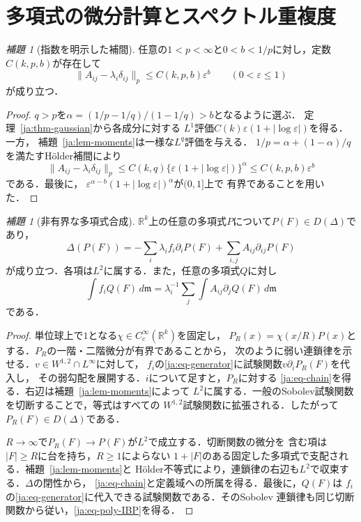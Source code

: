 \documentclass[12pt]{amsart}
\theoremstyle{definition}
\theoremstyle{remark}
\numberwithin{equation}{section}
\newcommand{\R}{\mathbb{R}}
\newcommand{\m}{\mathfrak m}
\theoremstyle{jpplain}
\newtheorem{jlem}[thm]{補題}
\begin{document}
\section{多項式の微分計算とスペクトル重複度}

\begin{jlem}[指数を明示した補間]\label{ja:lem-interp}
任意の$1<p<\infty$と$0<b<1/p$に対し，定数$C(k,p,b)$が存在して
\begin{equation}\label{ja:eq-Lp}
 \|A_{ij}-\lambda_i\delta_{ij}\|_p\leq C(k,p,b)\varepsilon^b
 \qquad(0<\varepsilon\leq1)
\end{equation}
が成り立つ．
\end{jlem}
\begin{proof}
$q>p$を$\alpha=(1/p-1/q)/(1-1/q)>b$となるように選ぶ．
定理~\ref{ja:thm-gaussian}から各成分に対する
$L^1$評価$C(k)\varepsilon(1+|\log\varepsilon|)$を得る．一方，
補題~\ref{ja:lem-moments}は一様な$L^q$評価を与える．
$1/p=\alpha+(1-\alpha)/q$を満たすHölder補間により
\[
 \|A_{ij}-\lambda_i\delta_{ij}\|_p
 \leq C(k,q)\{\varepsilon(1+|\log\varepsilon|)\}^{\alpha}
 \leq C(k,p,b)\varepsilon^b
\]
である．最後に，
$\varepsilon^{\alpha-b}(1+|\log\varepsilon|)^\alpha$が$(0,1]$上で
有界であることを用いた．
\end{proof}

\begin{jlem}[非有界な多項式合成]\label{ja:lem-domain}
$\R^k$上の任意の多項式$P$について$P(F)\in D(\Delta)$であり，
\begin{equation}\label{ja:eq-chain}
 \Delta(P(F))=-\sum_i\lambda_i f_i\partial_iP(F)
              +\sum_{i,j}A_{ij}\partial_{ij}P(F)
\end{equation}
が成り立つ．各項は$L^2$に属する．また，任意の多項式$Q$に対し
\begin{equation}\label{ja:eq-poly-IBP}
 \int f_iQ(F)\,d\m
 =\lambda_i^{-1}\sum_j\int A_{ij}\partial_jQ(F)\,d\m
\end{equation}
である．
\end{jlem}
\begin{proof}
単位球上で$1$となる$\chi\in C_c^\infty(\R^k)$を固定し，
$P_R(x)=\chi(x/R)P(x)$とする．$P_R$の一階・二階微分が有界であることから，
次のように弱い連鎖律を示せる．$v\in W^{1,2}\cap L^\infty$に対して，
$f_i$の\eqref{ja:eq-generator}に試験関数$v\partial_iP_R(F)$を代入し，
その弱勾配を展開する．$i$について足すと，$P_R$に対する
\eqref{ja:eq-chain}を得る．右辺は補題~\ref{ja:lem-moments}によって
$L^2$に属する．一般のSobolev試験関数を切断することで，等式はすべての
$W^{1,2}$試験関数に拡張される．したがって$P_R(F)\in D(\Delta)$である．

$R\to\infty$で$P_R(F)\to P(F)$が$L^2$で成立する．切断関数の微分を
含む項は$|F|\geq R$に台を持ち，$R\geq1$によらない
$1+|F|$のある固定した多項式で支配される．補題~\ref{ja:lem-moments}と
Hölder不等式により，連鎖律の右辺も$L^2$で収束する．$\Delta$の閉性から，
\eqref{ja:eq-chain}と定義域への所属を得る．最後に，$Q(F)$は
$f_i$の\eqref{ja:eq-generator}に代入できる試験関数である．そのSobolev
連鎖律も同じ切断関数から従い，\eqref{ja:eq-poly-IBP}を得る．
\end{proof}
\end{document}
